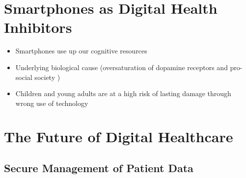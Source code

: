 \documentclass[xcolor=dvipsnames, aspectratio=1610]{beamer}
\begin{document}

\section{Smartphones as Digital Health Inhibitors}%
\label{sec:smartphones_as_digital_health_inhibitors}

\begin{frame}{\secname}
    \begin{itemize}[<+->]
        \item Smartphones use up our cognitive resources \cite{ward2017brain}
        \item Underlying biological cause (oversaturation of dopamine receptors \cite{nieoullon2002dopamine, dopamineRole} and pro-social society \cite{sapiens})
        \item Children and young adults are at a high risk of lasting damage through wrong use of technology \cite{crone2018media}
    \end{itemize}
\end{frame}


\section{The Future of Digital Healthcare}%
\label{sec:the_future_of_digital_healthcare}

\subsection{Secure Management of Patient Data}%
\label{sub:secure_management_of_patient_data}
\end{document}

